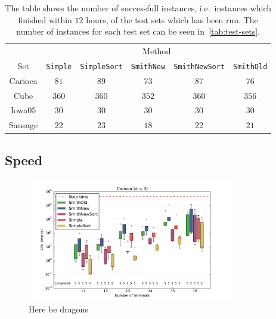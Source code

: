 \begin{table}[htbp]
  \centering
  \begin{tabular}{cccccc}
    \toprule
            & \multicolumn{5}{c}{Method}                               \\
    \cmidrule(l){2-6}
    Set     & \texttt{Simple} 
            & \texttt{SimpleSort}
            & \texttt{SmithNew} 
            & \texttt{SmithNewSort}
            & \texttt{SmithOld}                                        \\
    \cmidrule(r){1-1}\cmidrule(l){2-6}
    Carioca & $81$   & $89$       & $73$     & $87$         & $76$     \\
    Cube    & $360$  & $360$      & $352$    & $360$        & $356$    \\
    Iowa05  & $30$   & $30$       & $30$     & $30$         & $30$     \\
    Sausage & $22$   & $23$       & $18$     & $22$         & $21$     \\
    \bottomrule
  \end{tabular}
  \caption[Successfull test runs]{The table shows the number of successfull
    instances, i.e.\ instances which finished within $12$ hours, of the test
    sets which has been run. The number of instances for each test set can be
    seen in~\cref{tab:test-sets}.\label{tab:set-success}}
\end{table}

\subsection{Speed}
\label{sec:speed}

\begin{figure}[htbp]
  \centering
  \includegraphics[width=0.8\textwidth]{gfx/boxplots/plot_nvst_boxplot_d3_Carioca_1}
  \caption[Here be dragons]{Here be dragons}
\end{figure}

